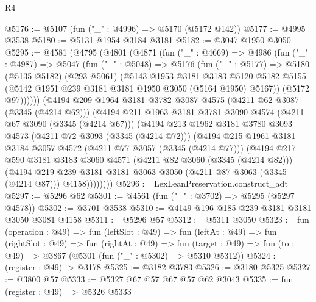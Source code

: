 \begin{lexlean}{R4}
\begin{coremodule}
@5176 := @5107 (fun ("_" : @4996) => @5170 (@5172 @142))
@5177 := @4995 @3538
@5180 := @5131 @1954 @3184 @3181
@5182 := @3047 @1950 @3050
@5295 := @4581
    (@4795
      (@4801
        (@4871
          (fun ("_" : @4669) =>
          @4986
            (fun ("_" : @4987) =>
            @5047
              (fun ("_" : @5048) =>
              @5176
                (fun ("_" : @5177) =>
                @5180
                  (@5135 @5182)
                  (@293 @5061)
                  (@5143
                    @1953
                    @3181
                    @3183
                    @5120
                    @5182
                    @5155
                    (@5142 @1951 @239 @3181 @3181 @1950 @3050 (@5164 @1950) @5167))
                  (@5172 @97))))))
        (@4194
          @209
          @1964
          @3181
          @3782
          @3087
          @4575
          (@4211 @62 @3087 (@3345 (@4214 @62)))
          (@4194
            @211
            @1963
            @3181
            @3781
            @3090
            @4574
            (@4211 @67 @3090 (@3345 (@4214 @67)))
            (@4194
              @213
              @1962
              @3181
              @3780
              @3093
              @4573
              (@4211 @72 @3093 (@3345 (@4214 @72)))
              (@4194
                @215
                @1961
                @3181
                @3184
                @3057
                @4572
                (@4211 @77 @3057 (@3345 (@4214 @77)))
                (@4194
                  @217
                  @590
                  @3181
                  @3183
                  @3060
                  @4571
                  (@4211 @82 @3060 (@3345 (@4214 @82)))
                  (@4194
                    @219
                    @239
                    @3181
                    @3181
                    @3063
                    @3050
                    (@4211 @87 @3063 (@3345 (@4214 @87)))
                    @4158))))))))
@5296 := LexLeanPreservation.construct_adt
@5297 := @5296 @62
@5301 := @4561 (fun ("_" : @3702) => @5295 (@5297 @4578))
@5302 := @3701 @3538
@5310 := @4149 @196 @185 @239 @3181 @3181 @3050 @3081 @4158
@5311 := @5296 @57
@5312 := @5311 @3050
@5323 := fun (operation : @49) =>
  fun (leftSlot : @49) =>
  fun (leftAt : @49) =>
  fun (rightSlot : @49) =>
  fun (rightAt : @49) =>
  fun (target : @49) => fun (to : @49) => @3867 (@5301 (fun ("_" : @5302) => @5310 @5312))
@5324 := (register : @49) -> @3178
@5325 := @3182 @3783
@5326 := @3180 @5325
@5327 := @3800 @57
@5333 := @5327 @67 @57 @67 @57 @62 @3043
@5335 := fun (register : @49) => @5326 @5333

\end{coremodule}
\end{lexlean}
